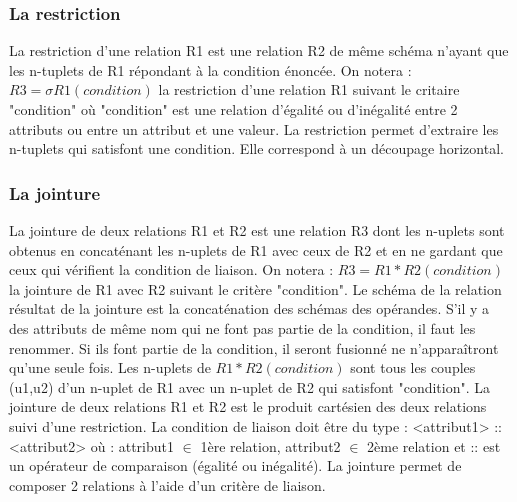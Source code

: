 \documentclass[12pt, a4paper, oneside, titlepage]{book}%
\begin{document}
\subsubsection{La restriction}
La restriction d'une relation R1 est une relation R2 de même schéma n'ayant que les n-tuplets de R1 répondant à la condition énoncée.
On notera : $R3 = \sigma R1 (condition)$ la restriction d'une relation R1 suivant le critaire "condition" où "condition" est une relation d'égalité ou d'inégalité entre 2 attributs ou entre un attribut et une valeur.
La restriction permet d'extraire les n-tuplets qui satisfont une condition. Elle correspond à un découpage horizontal.

\subsubsection{La jointure}
La jointure de deux relations R1 et R2 est une relation R3 dont les n-uplets sont obtenus en concaténant les n-uplets de R1 avec ceux de R2 et en ne gardant que ceux qui vérifient la condition de liaison.
On notera : $R3 = R1 \ast  R2 (condition)$ la jointure de R1 avec R2 suivant le critère "condition". Le schéma de la relation résultat de la jointure est la concaténation des schémas des opérandes. S'il y a des attributs de même nom qui ne font pas partie de la condition, il faut les renommer. Si ils font partie de la condition, il seront fusionné ne n'apparaîtront qu'une seule fois. Les n-uplets de $R1 \ast R2 (condition)$ sont tous les couples (u1,u2) d'un n-uplet de R1 avec un n-uplet de R2 qui satisfont "condition". La jointure de deux relations R1 et R2 est le produit cartésien des deux relations suivi d'une restriction. La condition de liaison doit être du type : <attribut1>  ::  <attribut2> où :  attribut1 $\in$ 1ère relation, attribut2 $\in$ 2ème relation et :: est un opérateur de comparaison (égalité ou inégalité). La jointure permet de composer 2 relations à l'aide d'un critère de liaison.

\end{document}
